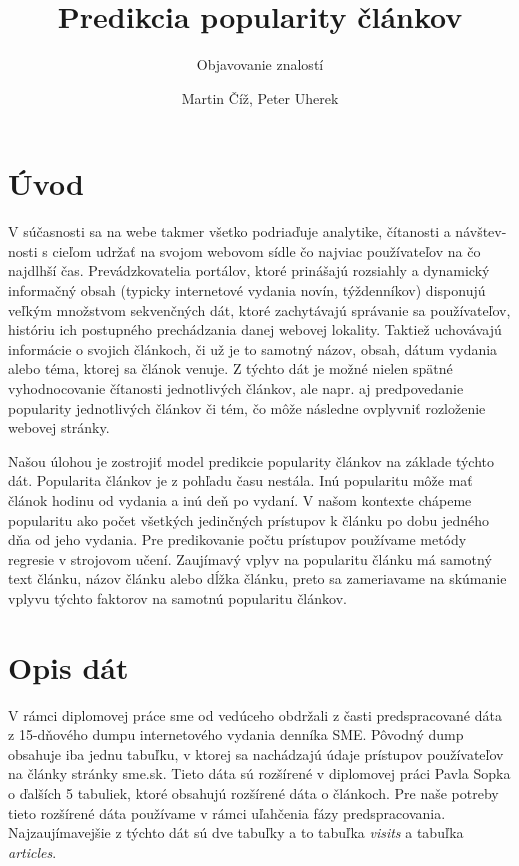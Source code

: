 \documentclass[runningheads,a4paper]{llncs}
\begin{document}
\title{Predikcia popularity článkov}
\subtitle{Objavovanie znalostí}
\author{Martin Číž, Peter Uherek}
\maketitle


\section{Úvod}
  V súčasnosti sa na webe takmer všetko podriaďuje analytike, čítanosti a 
návštev-nosti s cieľom udržať na svojom webovom sídle čo najviac používateľov na 
čo najdlhší čas. Prevádzkovatelia portálov, ktoré prinášajú rozsiahly a 
dynamický informačný obsah (typicky internetové vydania novín, týždenníkov) 
disponujú veľkým množstvom sekvenčných dát, ktoré zachytávajú správanie sa 
používateľov, históriu ich postupného prechádzania danej webovej lokality. 
Taktiež uchovávajú informácie o svojich článkoch, či už je to samotný názov, 
obsah, dátum vydania alebo téma, ktorej sa článok venuje. Z týchto dát je možné 
nielen spätné vyhodnocovanie čítanosti jednotlivých článkov, ale napr. aj 
predpovedanie popularity jednotlivých článkov či tém, čo môže následne ovplyvniť 
rozloženie webovej stránky. 

Našou úlohou je zostrojiť model predikcie popularity článkov na základe týchto dát.
Popularita článkov je z pohľadu času nestála. Inú popularitu môže mať článok hodinu od vydania a inú deň po vydaní.
V našom kontexte chápeme popularitu ako počet všetkých jedinčných prístupov k článku po dobu jedného dňa od jeho vydania.
Pre predikovanie počtu prístupov používame metódy regresie v strojovom učení.
Zaujímavý vplyv na popularitu článku má samotný text článku, názov článku alebo dĺžka článku, preto sa zameriavame na skúmanie vplyvu týchto faktorov na samotnú popularitu článkov.

\section{Opis dát}
V rámci diplomovej práce sme od vedúceho obdržali z časti predspracované dáta z 15-dňového dumpu internetového vydania denníka SME.
Pôvodný dump obsahuje iba jednu tabuľku, v ktorej sa nachádzajú údaje prístupov používateľov na články stránky sme.sk.
Tieto dáta sú rozšírené v diplomovej práci Pavla Sopka \cite{diplomovka} o ďalších 5 tabuliek, ktoré obsahujú rozšírené dáta o článkoch.
Pre naše potreby tieto rozšírené dáta používame v rámci uľahčenia fázy predspracovania.
Najzaujímavejšie z týchto dát sú dve tabuľky a to tabuľka {\em visits} a tabuľka {\em articles}.
\end{document}
